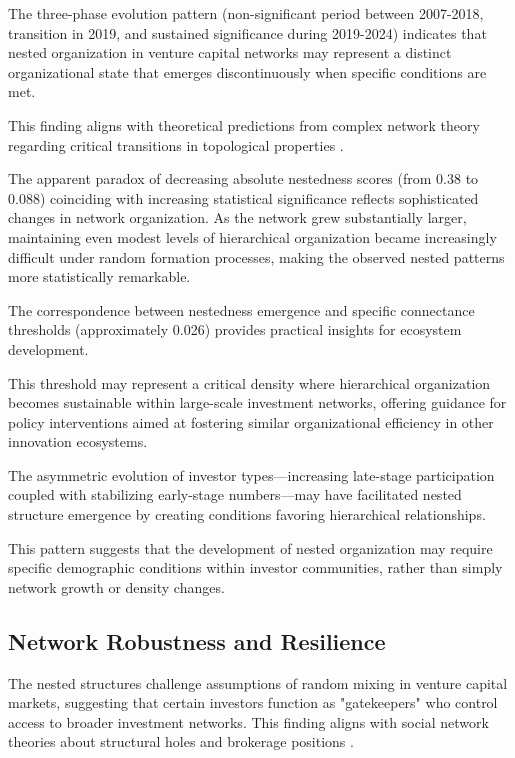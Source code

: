 The three-phase evolution pattern (non-significant period between 2007-2018, transition in 2019, and sustained significance during 2019-2024) indicates that nested organization in venture capital networks may represent a distinct organizational state that emerges discontinuously when specific conditions are met. 

This finding aligns with theoretical predictions from complex network theory regarding critical transitions in topological properties \cite{Mariani2019}.

The apparent paradox of decreasing absolute nestedness scores (from 0.38 to 0.088) coinciding with increasing statistical significance reflects sophisticated changes in network organization. As the network grew substantially larger, maintaining even modest levels of hierarchical organization became increasingly difficult under random formation processes, making the observed nested patterns more statistically remarkable. 

The correspondence between nestedness emergence and specific connectance thresholds (approximately 0.026) provides practical insights for ecosystem development. 

This threshold may represent a critical density where hierarchical organization becomes sustainable within large-scale investment networks, offering guidance for policy interventions aimed at fostering similar organizational efficiency in other innovation ecosystems.

The asymmetric evolution of investor types—increasing late-stage participation coupled with stabilizing early-stage numbers—may have facilitated nested structure emergence by creating conditions favoring hierarchical relationships. 

This pattern suggests that the development of nested organization may require specific demographic conditions within investor communities, rather than simply network growth or density changes.

\subsection{Network Robustness and Resilience}

The nested structures challenge assumptions of random mixing in venture capital markets, suggesting that certain investors function as "gatekeepers" who control access to broader investment networks. This finding aligns with social network theories about structural holes and brokerage positions \cite{Borgatti2011}.


